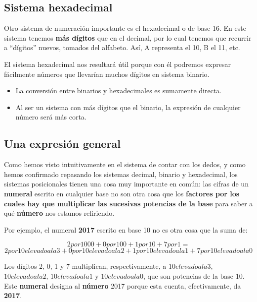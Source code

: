 \documentclass[spanish,A4,]{article}
\begin{document}
\subsection{Sistema hexadecimal}\label{sistema-hexadecimal}

Otro sistema de numeración importante es el hexadecimal o de base 16. En
este sistema tenemos \textbf{más dígitos} que en el decimal, por lo cual
tenemos que recurrir a ``dígitos'' nuevos, tomados del alfabeto. Así, A
representa el 10, B el 11, etc.

El sistema hexadecimal nos resultará útil porque con él podremos
expresar fácilmente números que llevarían muchos dígitos en sistema
binario.

\begin{itemize}
\itemsep1pt\parskip0pt
\item
  La conversión entre binarios y hexadecimales es sumamente directa.
\item
  Al ser un sistema con más dígitos que el binario, la expresión de
  cualquier número será más corta.
\end{itemize}

\subsection{Una expresión general}\label{una-expresiuxf3n-general}

Como hemos visto intuitivamente en el sistema de contar con los dedos, y
como hemos confirmado repasando los sistemas decimal, binario y
hexadecimal, los sistemas posicionales tienen una cosa muy importante en
común: las cifras de un \textbf{numeral} escrito en cualquier base no
son otra cosa que los \textbf{factores por los cuales hay que
multiplicar las sucesivas potencias de la base} para saber a qué
\textbf{número} nos estamos refiriendo.

Por ejemplo, el numeral \textbf{2017} escrito en base 10 no es otra cosa
que la suma de:

\[2  por  1 0 0 0 + 0  por  1 0 0 + 1  por  10 + 7  por  1 = \]
\[2  por  10 elevado a la 3 + 0  por  10 elevado a la 2 + 1  por  10 elevado a la 1 + 7  por  10 elevado a la 0\]

Los dígitos 2, 0, 1 y 7 multiplican, respectivamente, a $10 elevado a la 3$, $10 elevado a la 2$,
$10 elevado a la 1$ y $10 elevado a la 0$, que son potencias de la base 10. Este \textbf{numeral}
designa al \textbf{número} 2017 porque esta cuenta, efectivamente, da
\textbf{2017}.
\end{document}
